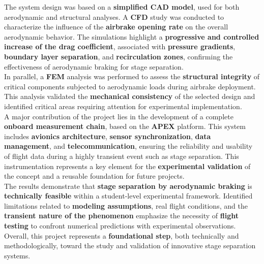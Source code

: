 The system design was based on a \textbf{simplified CAD model}, used for both aerodynamic and structural analyses. A
\textbf{\acrfull{CFD}} study was conducted to characterize the influence of the \textbf{airbrake opening rate} on the overall
aerodynamic behavior. The simulations highlight a \textbf{progressive and controlled increase of the drag coefficient},
associated with \textbf{pressure gradients}, \textbf{boundary layer separation}, and \textbf{recirculation zones}, confirming
the effectiveness of aerodynamic braking for stage separation.\\

In parallel, a \textbf{\acrfull{FEM}} analysis was performed to assess the \textbf{structural integrity} of critical components
subjected to aerodynamic loads during airbrake deployment. This analysis validated the \textbf{mechanical consistency} of the
selected design and identified critical areas requiring attention for experimental implementation.\\

A major contribution of the project lies in the development of a complete \textbf{onboard measurement chain}, based on the
\textbf{APEX} platform. This system includes \textbf{avionics architecture}, \textbf{sensor synchronization}, \textbf{data
management}, and \textbf{telecommunication}, ensuring the reliability and usability of flight data during a highly transient
event such as stage separation. This instrumentation represents a key element for the \textbf{experimental validation} of the
concept and a reusable foundation for future projects.\\

The results demonstrate that \textbf{stage separation by aerodynamic braking} is \textbf{technically feasible} within a
student-level experimental framework. Identified limitations related to \textbf{modeling assumptions}, real flight conditions,
and the \textbf{transient nature of the phenomenon} emphasize the necessity of \textbf{flight testing} to confront numerical
predictions with experimental observations. Overall, this project represents a \textbf{foundational step}, both technically and
methodologically, toward the study and validation of innovative stage separation systems.
